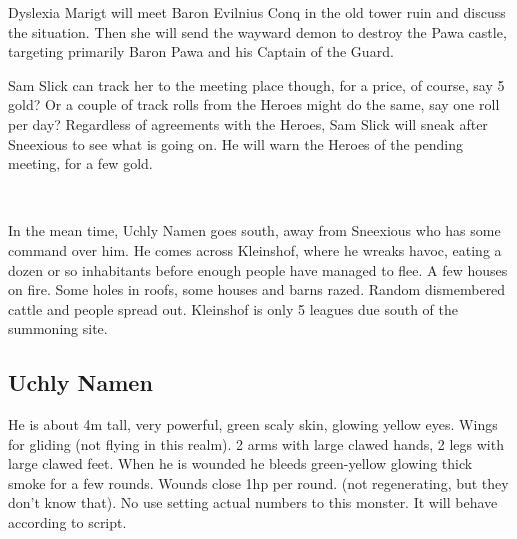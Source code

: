 \documentclass[11pt, twoside, titlepage, a4paper]{report}
\begin{document}
Dyslexia Marigt will meet Baron Evilnius Conq in the old tower ruin and discuss the situation. Then she will send the wayward demon to destroy the Pawa castle, targeting primarily Baron Pawa and his Captain of the Guard.

Sam Slick can track her to the meeting place though, for a price, of course, say 5 gold? Or a couple of track rolls from the Heroes might do the same, say one roll per day?
Regardless of agreements with the Heroes, Sam Slick will sneak after Sneexious to see what is going on. He will warn the Heroes of the pending meeting, for a few gold.

\

In the mean time, Uchly Namen goes south, away from Sneexious who has some command over him. He comes across Kleinshof, where he wreaks havoc, eating a dozen or so inhabitants before enough people have managed to flee.
A few houses on fire. Some holes in roofs, some houses and barns razed. Random dismembered cattle and people spread out. Kleinshof is only 5 leagues due south of the summoning site.


\subsection*{Uchly Namen}
He is about 4m tall, very powerful, green scaly skin, glowing yellow eyes. Wings for gliding (not flying in this realm). 2 arms with large clawed hands, 2 legs with large clawed feet.
When he is wounded he bleeds green-yellow glowing thick smoke for a few rounds. Wounds close 1hp per round. (not regenerating, but they don't know that).
No use setting actual numbers to this monster. It will behave according to script.
\end{document}
